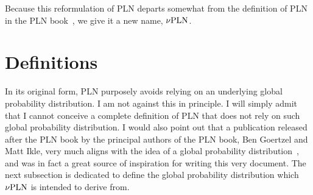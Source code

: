 \documentclass[]{article}
\begin{document}
Because this reformulation of PLN departs somewhat from the definition
of PLN in the PLN book~\cite{TODO}, we give it a new name, $\nu\textup{PLN}$.

\section{Definitions}
In its original form, PLN purposely avoids relying on an underlying
global probability distribution.  I am not against this in principle.
I will simply admit that I cannot conceive a complete definition of
PLN that does not rely on such global probability distribution.  I
would also point out that a publication released after the PLN book by
the principal authors of the PLN book, Ben Goertzel and Matt Ikle,
very much aligns with the idea of a global probability
distribution~\cite{TODO}, and was in fact a great source of
inspiration for writing this very document.  The next subsection is
dedicated to define the global probability distribution which $\nu\textup{PLN}$
is intended to derive from.
\end{document}
